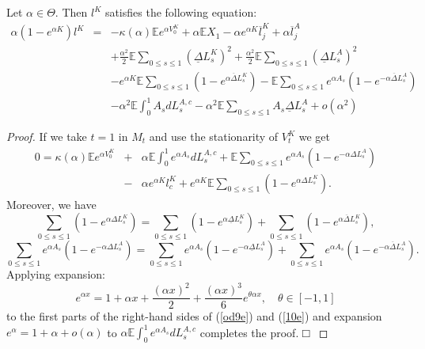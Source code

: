 \documentclass{aptpub}
\begin{document}
\begin{cor}\label{cor8}
Let $\alpha\in\Theta$. Then $l^K$ satisfies the following equation:
\begin{eqnarray}
\alpha (1-e^{\alpha K})l^K &=& -\kappa(\alpha)\mathbb{E} e^{\alpha V_0^K}+\alpha\mathbb{E}X_1-\alpha e^{\alpha K}\overline{l}_j^K+\alpha\overline{l}_j^A\nonumber\\
\nonumber &&+\frac{\alpha^2}{2}\mathbb{E}\sum_{0\leq s\leq 1}(\underline{\Delta}L_s^K)^2 +\frac{\alpha^2}{2}\mathbb{E}\sum_{0\leq s\leq 1}(\underline{\Delta}L_s^A)^2\\
\nonumber &&-e^{\alpha K}\mathbb{E}\sum_{0\leq s\leq 1}(1-e^{\alpha\overline{\Delta}L_s^K})-\mathbb{E}\sum_{0\leq s\leq 1}e^{\alpha A_s}(1-e^{-\alpha\overline{\Delta}L_s^A})\\
&&-\alpha^2\mathbb{E}\int_0^1A_sdL_s^{A,c}-\alpha^2\mathbb{E}\sum_{0\leq s\leq 1}A_s\underline{\Delta} L_s^A+o(\alpha^2)
\label{7e}
\end{eqnarray}
\end{cor}

\begin{proof} If we take $t=1$ in $M_t$ and use the stationarity of $V_t^K$ we get
\begin{eqnarray}
0=\kappa(\alpha)\mathbb{E}e^{\alpha V_0^K}&+&\alpha\mathbb{E}\int_0^1e^{\alpha A_s}dL_s^{A,c}+\mathbb{E}\sum_{0\leq s\leq 1}e^{\alpha A_s}(1-e^{-\alpha\Delta L_s^A})\\ \nonumber &-&\alpha e^{\alpha K}l_c^K+e^{\alpha K}\mathbb{E}\sum_{0\leq s\leq 1}(1-e^{\alpha\Delta L_s^K}).\label{odn8}
\end{eqnarray}
Moreover, we have
\begin{equation}\label{od9e}\sum_{0\leq s\leq 1}(1-e^{\alpha\Delta L_s^K})=\sum_{0\leq s\leq 1}(1-e^{\alpha\underline{\Delta} L_s^K})+\sum_{0\leq s\leq 1}(1-e^{\alpha\overline{\Delta} L_s^K}),
\end{equation}
\begin{equation}\label{10e}
\sum_{0\leq s\leq 1}e^{\alpha A_s}(1-e^{-\alpha\Delta L_s^A})=\sum_{0\leq s\leq 1}e^{\alpha A_s}(1-e^{-\alpha\underline{\Delta} L_s^A})+\sum_{0\leq s\leq 1}e^{\alpha A_s}(1-e^{-\alpha\overline{\Delta} L_s^A}).
\end{equation}
Applying expansion:
\begin{equation}
e^{\alpha x}=1+\alpha x+\frac{(\alpha x)^2}{2}+\frac{(\alpha x)^3}{6}e^{\theta\alpha x},\quad \theta\in [-1,1]
\end{equation}
to the first parts of the right-hand sides of (\ref{od9e}) and (\ref{10e}) and expansion $e^\alpha=1+\alpha+o(\alpha)$ to
$\alpha\mathbb{E}\int_0^1e^{\alpha A_s}dL_s^{A,c}$ completes the proof.{\newline\vspace{3mm}\hfill $\Box$}\end{proof}
\end{document}

